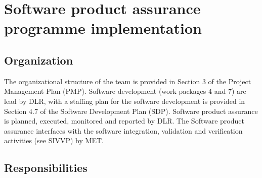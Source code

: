 \section{Software product assurance programme implementation}

%
%
%
%
%
%

%
%
%
%
%
%

\subsection{Organization}
\label{subsec:product-assurance-organization}

The organizational structure of the team is provided in Section 3 of the Project Management Plan (PMP). Software development (work packages 4 and 7) are lead by DLR, with a staffing plan for the software development is provided in Section 4.7 of the Software Development Plan (SDP). Software product assurance is planned, executed, monitored and reported by DLR. The Software product assurance interfaces with the software integration, validation and verification activities (see SIVVP) by MET.

\subsection{Responsibilities}
\label{subsec:responsibilities}

